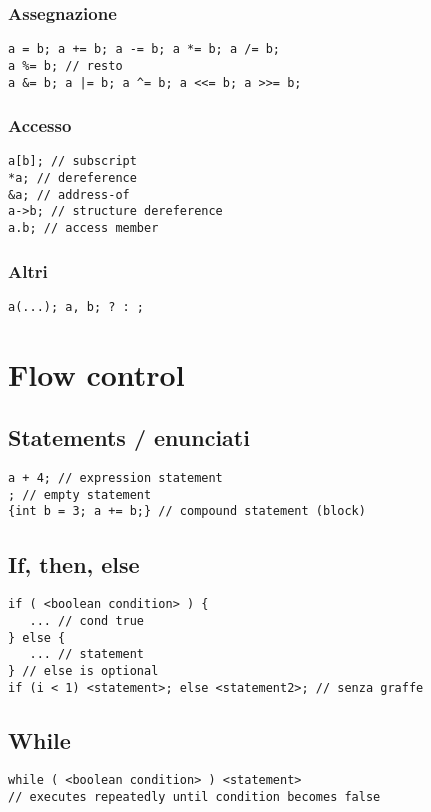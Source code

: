 \documentclass[10pt, oneside]{Book}
\begin{document}
\subsection{Assegnazione}
\begin{verbatim}
a = b; a += b; a -= b; a *= b; a /= b; 
a %= b; // resto
a &= b; a |= b; a ^= b; a <<= b; a >>= b;
\end{verbatim}
\subsection{Accesso}
\begin{verbatim}
a[b]; // subscript
*a; // dereference
&a; // address-of
a->b; // structure dereference
a.b; // access member
\end{verbatim}
\subsection{Altri}
\begin{verbatim}
a(...); a, b; ? : ;
\end{verbatim}

\chapter{Flow control}

\section{Statements / enunciati}
\begin{verbatim}
a + 4; // expression statement
; // empty statement
{int b = 3; a += b;} // compound statement (block)
\end{verbatim}

\section{If, then, else}
\begin{verbatim}
if ( <boolean condition> ) { 
   ... // cond true
} else { 
   ... // statement
} // else is optional
if (i < 1) <statement>; else <statement2>; // senza graffe
\end{verbatim}

\section{While}
\begin{verbatim}
while ( <boolean condition> ) <statement>
// executes repeatedly until condition becomes false
\end{verbatim}
\end{document}
